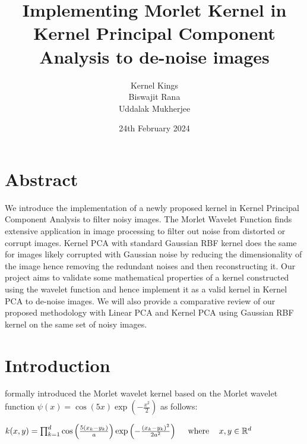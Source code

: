 \documentclass[11pt, oneside]{article}   	%
\title{Implementing Morlet Kernel in Kernel Principal Component Analysis to de-noise images}
\author{Kernel Kings\\
Biswajit Rana\\
Uddalak Mukherjee}
\date{24th February 2024}							%
\begin{document}
\maketitle

\section*{Abstract}

We introduce the implementation of a newly proposed kernel in Kernel Principal Component Analysis to filter noisy images. The Morlet Wavelet Function finds extensive application in image processing to filter out noise from distorted or corrupt images. Kernel PCA with standard Gaussian RBF kernel does the same for images likely corrupted with Gaussian noise by reducing the dimensionality of the image hence removing the redundant noises and then reconstructing it. Our project aims to validate some mathematical properties of a kernel constructed using the wavelet function and hence implement it as a valid kernel in Kernel PCA to de-noise images. We will also provide a comparative review of our proposed methodology with Linear PCA and Kernel PCA using Gaussian RBF kernel on the same set of noisy images. 


\section{Introduction}
\cite{PMK} formally introduced the Morlet wavelet kernel based on the Morlet wavelet function $ \psi(x) = \cos(5x)\exp(-\frac{x^2}{2})$  as follows:

\vspace{0.3cm}
\begin{center}
    
$k(x, y)=\prod_{k=1}^d \cos \left(\frac{5\left(x_k-y_k\right)}{a}\right) \exp \left(-\frac{\left(x_k-y_k\right)^2}{2 a^2}\right) \quad \text { where } \hspace{0.3cm} x, y \in \mathbb{R}^d$

    
\end{center}

\vspace{0.3cm}
\end{document}
